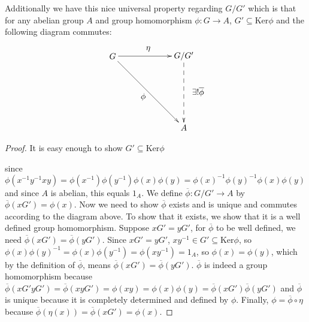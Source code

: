\documentclass[11pt]{article}
\theoremstyle{definition}
\theoremstyle{plain}
\theoremstyle{plain}
\theoremstyle{plain}
\begin{document}
Additionally we have this nice universal property regarding $G/G'$ which is that for any abelian group $A$ and group homomorphism $\phi : G \to A$, $G' \subseteq \text{Ker}\phi$ and the following diagram commutes:

\begin{equation*}
\begin{xy}
(0,0)*+{G}="G"; (30,0)*+{G/G'}="gprime"; (30,-30)*+{A}="A";
{\ar "G";"gprime"}?*!/_3mm/{\eta};
{\ar "G";"A"}?*!/^3mm/{\phi};
{\ar@{-->} "gprime";"A"}?*!/_6mm/{\exists ! \overline{\phi}}
\end{xy}
\end{equation*}

\begin{proof}
It is easy enough to show $G' \subseteq \text{Ker}\phi$ 

since $\phi(x^{-1}y^{-1}xy)=\phi(x^{-1})\phi(y^{-1})\phi(x)\phi(y)=\phi(x)^{-1}\phi(y)^{-1}\phi(x)\phi(y)$ and since $A$ is abelian, this equals $1_{A}$. We define $\overline{\phi} : G/G' \to A$ by $\overline{\phi}(xG')=\phi(x)$. Now we need to show $\overline{\phi}$ exists and is unique and commutes according to the diagram above. To show that it exists, we show that it is a well defined group homomorphism. Suppose $xG'=yG'$, for $\overline{\phi}$ to be well defined, we need $\overline{\phi}(xG')=\overline{\phi}(yG')$. Since $xG'=yG'$, $xy^{-1} \in G' \subseteq \text{Ker}\phi$, so $\phi(x)\phi(y)^{-1}=\phi(x)\phi(y^{-1})=\phi(xy^{-1})=1_{A}$, so $\phi(x)=\phi(y)$, which by the definition of $\overline{\phi}$, means $\overline{\phi}(xG')=\overline{\phi}(yG')$. $\overline{\phi}$ is indeed a group homomorphism because $\overline{\phi}(xG'yG')=\overline{\phi}(xyG')=\phi(xy)=\phi(x)\phi(y)=\overline{\phi}(xG')\overline{\phi}(yG')$ and $\overline{\phi}$ is unique because it is completely determined and defined by $\phi$. Finally, $\phi = \overline{\phi} \circ \eta$ because $\overline{\phi}(\eta(x))=\overline{\phi}(xG')=\phi(x)$.
\end{proof}
\end{document}
